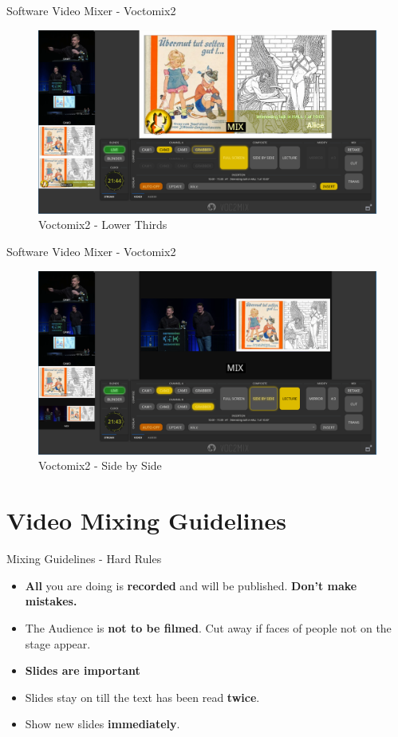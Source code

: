 \documentclass[aspectratio=169]{beamer}
\begin{document}
\begin{frame}{Software Video Mixer - Voctomix2}
	\begin{figure} 
		\centering
		\includegraphics[width=.9\textwidth]{images/voctomix2_2.png}
		\caption{Voctomix2 - Lower Thirds}
	\end{figure}
\end{frame}

\begin{frame}{Software Video Mixer - Voctomix2}
	\begin{figure} 
		\centering
		\includegraphics[width=.9\textwidth]{images/voctomix2_3.png}
		\caption{Voctomix2 - Side by Side}
	\end{figure}
\end{frame}




\section{Video Mixing Guidelines}
\begin{frame}{Mixing Guidelines - Hard Rules}
	\begin{itemize}
		\item \textbf{All} you are doing is \textbf{recorded} and will be published. \alert{\textbf{Don't make mistakes.}}
		\item The Audience is \textbf{not to be filmed}. Cut away if faces of people not on the stage appear.
		\item \textbf{Slides are important}
		\item Slides stay on till the text has been read \textbf{twice}.
		\item Show new slides \textbf{immediately}.
	\end{itemize}

\end{frame}
\end{document}
